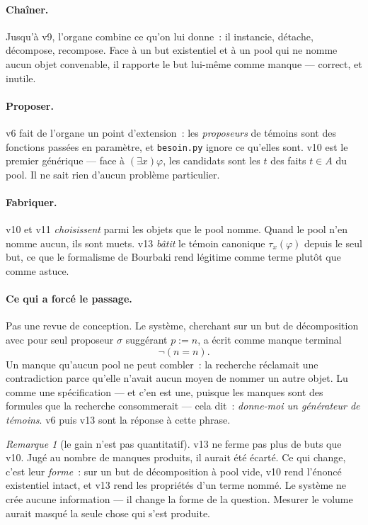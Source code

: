 \documentclass[11pt]{article}
\theoremstyle{remark}\newtheorem{remarque}{Remarque}
\begin{document}
\paragraph{Chaîner.} Jusqu'à v9, l'organe combine ce qu'on lui donne~: il instancie,
détache, décompose, recompose. Face à un but existentiel et à un pool qui ne nomme aucun
objet convenable, il rapporte le but lui-même comme manque --- correct, et inutile.

\paragraph{Proposer.} v6 fait de l'organe un point d'extension~: les \emph{proposeurs} de
témoins sont des fonctions passées en paramètre, et \texttt{besoin.py} ignore ce qu'elles
sont. v10 est le premier générique --- face à $(\exists x)\varphi$, les candidats sont
les $t$ des faits $t \in A$ du pool. Il ne sait rien d'aucun problème particulier.

\paragraph{Fabriquer.} v10 et v11 \emph{choisissent} parmi les objets que le pool nomme.
Quand le pool n'en nomme aucun, ils sont muets. v13 \emph{bâtit} le témoin canonique
$\tau_x(\varphi)$ depuis le seul but, ce que le formalisme de Bourbaki rend légitime
comme terme plutôt que comme astuce.

\paragraph{Ce qui a forcé le passage.} Pas une revue de conception. Le système, cherchant
sur un but de décomposition avec pour seul proposeur $\sigma$ suggérant $p := n$, a écrit
comme manque terminal
\[ \neg(n = n) . \]
Un manque qu'aucun pool ne peut combler~: la recherche réclamait une contradiction parce
qu'elle n'avait aucun moyen de nommer un autre objet. Lu comme une spécification --- et
c'en est une, puisque les manques sont des formules que la recherche consommerait ---
cela dit~: \emph{donne-moi un générateur de témoins}. v6 puis v13 sont la réponse à cette
phrase.

\begin{remarque}[le gain n'est pas quantitatif]\label{rem:shape}
v13 ne ferme pas plus de buts que v10. Jugé au nombre de manques produits, il aurait été
écarté. Ce qui change, c'est leur \emph{forme}~: sur un but de décomposition à pool vide,
v10 rend l'énoncé existentiel intact, et v13 rend les propriétés d'un terme nommé. Le
système ne crée aucune information --- il change la forme de la question. Mesurer le
volume aurait masqué la seule chose qui s'est produite.
\end{remarque}
\end{document}
